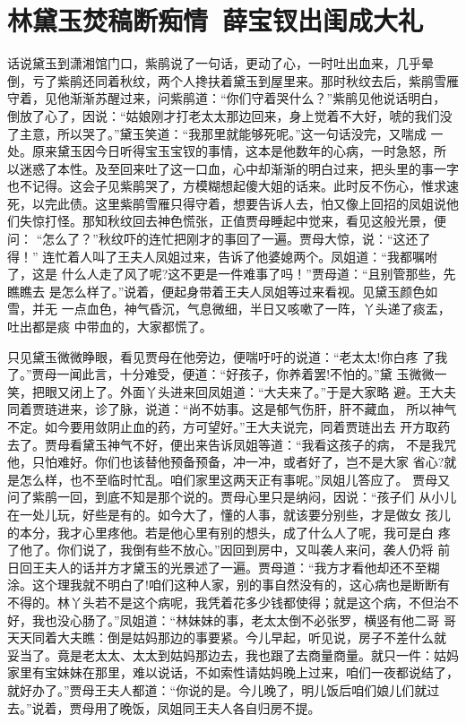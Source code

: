 \chapter{林黛玉焚稿断痴情~薛宝钗出闺成大礼}

话说黛玉到潇湘馆门口，紫鹃说了一句话，更动了心，一时吐出血来，几乎晕
倒，亏了紫鹃还同着秋纹，两个人搀扶着黛玉到屋里来。那时秋纹去后，紫鹃雪雁
守着，见他渐渐苏醒过来，问紫鹃道：“你们守着哭什么？”紫鹃见他说话明白，
倒放了心了，因说：“姑娘刚才打老太太那边回来，身上觉着不大好，唬的我们没
了主意，所以哭了。”黛玉笑道：“我那里就能够死呢。”这一句话没完，又喘成
一处。原来黛玉因今日听得宝玉宝钗的事情，这本是他数年的心病，一时急怒，所
以迷惑了本性。及至回来吐了这一口血，心中却渐渐的明白过来，把头里的事一字
也不记得。这会子见紫鹃哭了，方模糊想起傻大姐的话来。此时反不伤心，惟求速
死，以完此债。这里紫鹃雪雁只得守着，想要告诉人去，怕又像上回招的凤姐说他
们失惊打怪。那知秋纹回去神色慌张，正值贾母睡起中觉来，看见这般光景，便问：
“怎么了？”秋纹吓的连忙把刚才的事回了一遍。贾母大惊，说：“这还了得！”
连忙着人叫了王夫人凤姐过来，告诉了他婆媳两个。凤姐道：“我都嘱咐了，这是
什么人走了风了呢?这不更是一件难事了吗！”贾母道：“且别管那些，先瞧瞧去
是怎么样了。”说着，便起身带着王夫人凤姐等过来看视。见黛玉颜色如雪，并无
一点血色，神气昏沉，气息微细，半日又咳嗽了一阵，丫头递了痰盂，吐出都是痰
中带血的，大家都慌了。

只见黛玉微微睁眼，看见贾母在他旁边，便喘吁吁的说道：“老太太!你白疼
了我了。”贾母一闻此言，十分难受，便道：“好孩子，你养着罢!不怕的。”黛
玉微微一笑，把眼又闭上了。外面丫头进来回凤姐道：“大夫来了。”于是大家略
避。王大夫同着贾琏进来，诊了脉，说道：“尚不妨事。这是郁气伤肝，肝不藏血，
所以神气不定。如今要用敛阴止血的药，方可望好。”王大夫说完，同着贾琏出去
开方取药去了。贾母看黛玉神气不好，便出来告诉凤姐等道：“我看这孩子的病，
不是我咒他，只怕难好。你们也该替他预备预备，冲一冲，或者好了，岂不是大家
省心?就是怎么样，也不至临时忙乱。咱们家里这两天正有事呢。”凤姐儿答应了。
贾母又问了紫鹃一回，到底不知是那个说的。贾母心里只是纳闷，因说：“孩子们
从小儿在一处儿玩，好些是有的。如今大了，懂的人事，就该要分别些，才是做女
孩儿的本分，我才心里疼他。若是他心里有别的想头，成了什么人了呢，我可是白
疼了他了。你们说了，我倒有些不放心。”因回到房中，又叫袭人来问，袭人仍将
前日回王夫人的话并方才黛玉的光景述了一遍。贾母道：“我方才看他却还不至糊
涂。这个理我就不明白了!咱们这种人家，别的事自然没有的，这心病也是断断有
不得的。林丫头若不是这个病呢，我凭着花多少钱都使得；就是这个病，不但治不
好，我也没心肠了。”凤姐道：“林妹妹的事，老太太倒不必张罗，横竖有他二哥
哥天天同着大夫瞧：倒是姑妈那边的事要紧。今儿早起，听见说，房子不差什么就
妥当了。竟是老太太、太太到姑妈那边去，我也跟了去商量商量。就只一件：姑妈
家里有宝妹妹在那里，难以说话，不如索性请姑妈晚上过来，咱们一夜都说结了，
就好办了。”贾母王夫人都道：“你说的是。今儿晚了，明儿饭后咱们娘儿们就过
去。”说着，贾母用了晚饭，凤姐同王夫人各自归房不提。

